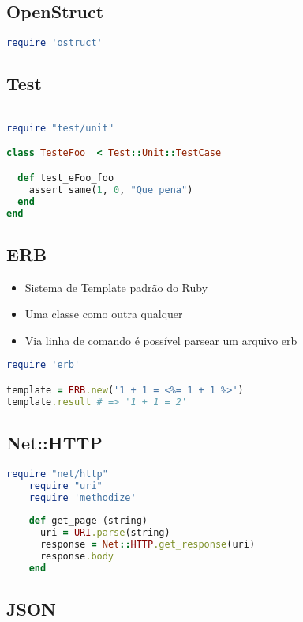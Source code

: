 \documentclass[serif,mathserif]{article}
\begin{document}
\subsection{OpenStruct}

\begin{lstlisting}[language=ruby]
require 'ostruct'
\end{lstlisting}

\subsection{Test}

\begin{lstlisting}[language=ruby]

require "test/unit"

class TesteFoo  < Test::Unit::TestCase

  def test_eFoo_foo
    assert_same(1, 0, "Que pena")
  end
end
\end{lstlisting}

\subsection{ERB}

\begin{itemize}
  \item Sistema de Template padrão do Ruby
  \item Uma classe como outra qualquer
  \item Via linha de comando é possível parsear um arquivo erb
\end{itemize}

\begin{lstlisting}[language=ruby]
require 'erb'

template = ERB.new('1 + 1 = <%= 1 + 1 %>')
template.result # => '1 + 1 = 2'
\end{lstlisting}

\subsection{Net::HTTP}

\begin{lstlisting}[language=ruby]
	require "net/http"
	require "uri"
	require 'methodize'
	
	def get_page (string)
	  uri = URI.parse(string)
	  response = Net::HTTP.get_response(uri)
	  response.body
	end
\end{lstlisting}

\subsection{JSON}
\end{document}
